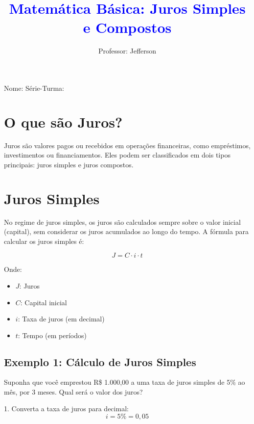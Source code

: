 \documentclass[11pt]{article}
\title{\textcolor{blue}{Matemática Básica: Juros Simples e Compostos}}
\author{Professor: Jefferson}
\date{}
\begin{document}
\maketitle
\vspace{-1cm}  %

\begin{center}
\large{Nome: \underline{\hspace{8cm}} \quad Série-Turma: \underline{\hspace{3cm}}}
\end{center}

\begin{multicols}{2}

\section*{O que são Juros?}

Juros são valores pagos ou recebidos em operações financeiras, como empréstimos, investimentos ou financiamentos. Eles podem ser classificados em dois tipos principais: juros simples e juros compostos.

\section*{Juros Simples}

No regime de juros simples, os juros são calculados sempre sobre o valor inicial (capital), sem considerar os juros acumulados ao longo do tempo. A fórmula para calcular os juros simples é:

\[
J = C \cdot i \cdot t
\]

Onde:
\begin{itemize}
    \item  \( J \): Juros
    \item  \( C \): Capital inicial
    \item  \( i \): Taxa de juros (em decimal)
    \item  \( t \): Tempo (em períodos)
\end{itemize}

\subsection*{Exemplo 1: Cálculo de Juros Simples}

Suponha que você emprestou R\$ 1.000,00 a uma taxa de juros simples de 5\% ao mês, por 3 meses. Qual será o valor dos juros?

1. Converta a taxa de juros para decimal:
\[
i = 5\% = 0,05
\]


\end{multicols}
\end{document}
